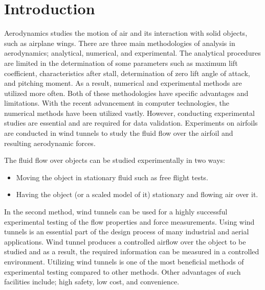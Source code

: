 \documentclass[fleqn,10pt]{SelfArx} %
\affiliation{\textsuperscript{1}\textit{Department of Mechanical Engineering, The University of British Columbia}}
\affiliation{*\textbf{Corresponding author}} %
\begin{document}
\flushbottom %

\maketitle %

\tableofcontents %

\thispagestyle{empty} %


\section{Introduction}
Aerodynamics studies the motion of air and its interaction with solid objects, such as  airplane wings. There are three main methodologies of analysis in aerodynamics; analytical, numerical, and experimental. The analytical procedures are limited in the determination of some parameters such as maximum lift coefficient, characteristics after stall, determination of zero  lift angle of attack, and pitching moment. As a result, numerical and experimental methods are utilized more often. Both of these methodologies have specific advantages and limitations. With the recent advancement in computer technologies, the numerical methods have been utilized vastly. However, conducting experimental studies are essential and are required for data validation. Experiments on airfoils are conducted in wind tunnels to study the fluid flow over the airfoil and resulting aerodynamic forces.

The fluid flow over objects can be studied experimentally in two ways:
\begin{itemize}
\item Moving the object in stationary fluid such as free flight tests.
\item Having the object (or a scaled model of it) stationary and flowing air over it.
\end{itemize}
In the second method, wind tunnels can be used for a highly successful experimental testing of the flow properties and force measurements. Using wind tunnels is an essential part of the design process of many industrial and aerial applications. Wind tunnel produces a controlled airflow over the object to be studied and as a result, the required information can be measured in a controlled environment. Utilizing wind tunnels is one of the most beneficial methods of experimental testing compared to other methods. Other advantages of such facilities include; high safety, low cost, and convenience.
\end{document}
